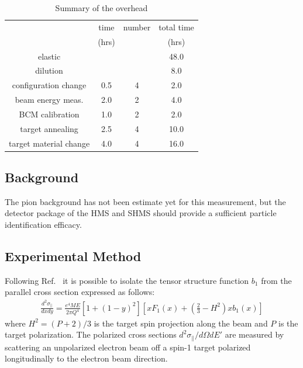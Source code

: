 \begin{table}[h]
\begin{center}
\caption{\label{OVHEAD}Summary of the overhead}
\begin{tabular}{c|ccc}\hline\hline
     ~                 &  time   & number &   total time \\
     ~                 &  (hrs)  &   ~    &    (hrs)     \\
\hline
elastic                &    ~    &   ~    &     48.0     \\
dilution               &    ~    &   ~    &     8.0      \\
configuration change   &   0.5   &   4    &     2.0      \\
beam energy meas.      &   2.0   &   2    &     4.0      \\
BCM calibration        &   1.0   &   2    &     2.0      \\
target annealing       &   2.5   &   4    &     10.0     \\
target material change &   4.0   &   4    &     16.0     \\
\hline\hline
\end{tabular}
\end{center}
\end{table}

\subsection{Background}
The pion background has not been estimate yet for this measurement, but the detector package
of the HMS and SHMS should provide a sufficient particle identification efficacy.

\subsection{Experimental Method}
Following Ref.~\cite{Hoodbhoy:1988am} it is possible to isolate the tensor structure function 
$b_1$ from the parallel cross section expressed as follows:
\begin{eqnarray}
\frac{d^2\sigma_{\parallel}}{dx dy} = \frac{e^4 M E}{2 \pi Q^4} [1+(1-y)^2] [x F_1(x) + (\frac{2}{3} - H^2) x b_1(x)]
\label{xsmeth}
\end{eqnarray}
%
where $H^2=(P+2)/3$ is the target spin projection along the beam and $P$ is the target 
polarization. The polarized cross sections $d^2\sigma_{\parallel}/d\Omega dE'$ are measured
by scattering an unpolarized electron beam off a spin-1 target polarized longitudinally 
to the electron beam direction. 


